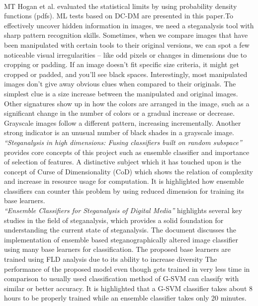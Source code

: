 \\MT Hogan et al.\cite{3} evaluated the statistical limits by using probability density functions (pdfs). ML tests based on DC-DM are presented in this paper.To effectively uncover hidden information in images, we need a steganalysis tool with sharp pattern recognition skills. Sometimes, when we compare images that have been manipulated with certain tools to their original versions, we can spot a few noticeable visual irregularities – like odd pixels or changes in dimensions due to cropping or padding. If an image doesn't fit specific size criteria, it might get cropped or padded, and you'll see black spaces. Interestingly, most manipulated images don't give away obvious clues when compared to their originals. The simplest clue is a size increase between the manipulated and original images. Other signatures show up in how the colors are arranged in the image, such as a significant change in the number of colors or a gradual increase or decrease. Grayscale images follow a different pattern, increasing incrementally. Another strong indicator is an unusual number of black shades in a grayscale image.\\
\textit{``Steganalysis in high dimensions: Fusing classifiers built on random subspace''}\cite{8} provides core concepts of this project such as ensemble classifier and importance of selection of features. A distinctive subject which it has touched upon is the concept of Curse of Dimensionality (CoD) which shows the relation of complexity and increase in  resource usage for computation. It is highlighted how ensemble classifiers can counter this problem by using reduced dimension for training its base learners.\\
\textit{``Ensemble Classifiers for Steganalysis of Digital Media''}\cite{5} highlights several key studies in the field of steganalysis, which provides a solid foundation for understanding the current state of steganalysis. The document discusses the implementation of ensemble based steganographically altered image classifier using many base learners for classification. The proposed base learners are trained using FLD analysis due to its ability to increase diversity The performance of the proposed model even though gets trained in very less time in comparison to usually used classification method of G-SVM can classify with similar or better accuracy. It is highlighted that a G-SVM classifier takes about 8 hours to be properly trained while an ensemble classifier takes only 20 minutes.\\                   
